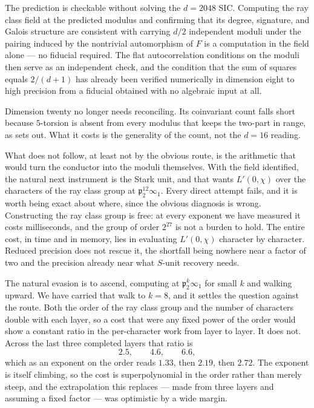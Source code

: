 \documentclass[12pt,a4paper]{article}
\newcommand{\Fd}{F}
\newcommand{\pt}{\mathfrak{p}_2}
\begin{document}
The prediction is checkable without solving the $d=2048$ SIC. Computing the ray class field at the predicted modulus and confirming that its degree, signature, and Galois structure are consistent with carrying $d/2$ independent moduli under the pairing induced by the nontrivial automorphism of $\Fd$ is a computation in the field alone — no fiducial required. The flat autocorrelation conditions on the moduli then serve as an independent check, and the condition that the sum of squares equals $2/(d+1)$ has already been verified numerically in dimension eight to high precision from a fiducial obtained with no algebraic input at all.

Dimension twenty no longer needs reconciling. Its coinvariant count falls short because $5$-torsion is absent from every modulus that keeps the two-part in range, as  sets out. What it costs is the generality of the count, not the $d=16$ reading.

What does not follow, at least not by the obvious route, is the arithmetic that
would turn the conductor into the moduli themselves. With the field identified,
the natural next instrument is the Stark unit, and that wants $L'(0,\chi)$ over
the characters of the ray class group at $\pt^{12}\infty_1$. Every direct attempt fails, and it is worth being
exact about where, since the obvious diagnosis is wrong. Constructing the ray
class group is free: at every exponent we have measured it costs milliseconds,
and the group of order $2^{27}$ is not a burden to hold. The entire cost, in time
and in memory, lies in evaluating $L'(0,\chi)$ character by character. Reduced
precision does not rescue it, the shortfall being nowhere near a factor of two
and the precision already near what $S$-unit recovery needs.

The natural evasion is to ascend, computing at $\pt^{k}\infty_1$ for small $k$
and walking upward. We have carried that walk to $k=8$, and it settles the
question against the route. Both the order of the ray class group and the number
of characters double with each layer, so a cost that were any fixed power of the
order would show a constant ratio in the per-character work from layer to layer.
It does not. Across the last three completed layers that ratio is
\[
  2.5, \qquad 4.6, \qquad 6.6,
\]
which as an exponent on the order reads $1.33$, then $2.19$, then $2.72$. The
exponent is itself climbing, so the cost is superpolynomial in the order rather
than merely steep, and the extrapolation this replaces — made from three layers
and assuming a fixed factor — was optimistic by a wide margin.
\end{document}
